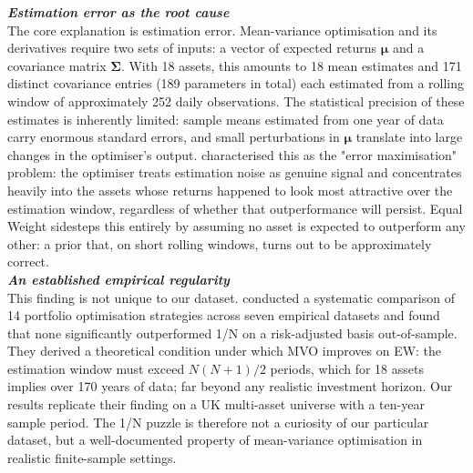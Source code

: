 \documentclass[a4paper,alpha-refs]{scr-contemporary}
\numberwithin{equation}{section}
\begin{document}
\noindent\textbf{\emph{Estimation error as the root cause}} \\
\indent The core explanation is estimation error. Mean-variance optimisation and its
derivatives require two sets of inputs: a vector of expected returns $\boldsymbol{\mu}$
and a covariance matrix $\boldsymbol{\Sigma}$. With 18 assets, this amounts to 18 mean
estimates and 171 distinct covariance entries (189 parameters in total) each estimated
from a rolling window of approximately 252 daily observations. \newline
\indent The statistical precision of
these estimates is inherently limited: sample means estimated from one year of data carry
enormous standard errors, and small perturbations in $\boldsymbol{\mu}$ translate into
large changes in the optimiser's output. \citet{michaud_markowitz_1989} characterised this as the
"error maximisation" problem: the optimiser treats estimation noise as genuine signal and
concentrates heavily into the assets whose returns happened to look most attractive over
the estimation window, regardless of whether that outperformance will persist. \newline
\indent Equal Weight
sidesteps this entirely by assuming no asset is expected to outperform any other:
a prior that, on short rolling windows, turns out to be approximately correct. \\

\noindent\textbf{\emph{An established empirical regularity}} \\
\indent This finding is not unique to our dataset. \citet{demiguel_optimal_2009}
conducted a systematic comparison of 14 portfolio optimisation strategies across seven
empirical datasets and found that none significantly outperformed 1/N on a risk-adjusted
basis out-of-sample. \newline 
\indent They derived a theoretical condition under which MVO improves on EW:
the estimation window must exceed $N(N+1)/2$ periods, which for 18 assets implies over
170 years of data; far beyond any realistic investment horizon. Our results replicate
their finding on a UK multi-asset universe with a ten-year sample period. The 1/N puzzle
is therefore not a curiosity of our particular dataset, but a well-documented property of
mean-variance optimisation in realistic finite-sample settings. \\
\end{document}

